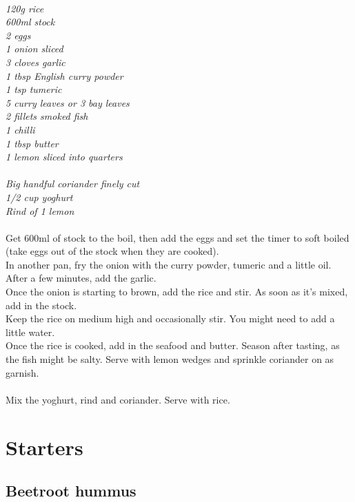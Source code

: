 \documentclass{tufte-book}
\begin{document}
\\\emph{120g rice
\\600ml stock
\\2 eggs
\\1 onion sliced
\\3 cloves garlic
\\1 tbsp English curry powder
\\1 tsp tumeric
\\5 curry leaves or 3 bay leaves
\\2 fillets smoked fish
\\1 chilli
\\1 tbsp butter
\\1 lemon sliced into quarters
}
\\
\\\emph{Big handful coriander finely cut
\\1/2 cup yoghurt
\\Rind of 1 lemon
}
\smallskip
\\
\\Get 600ml of stock to the boil, then add the eggs and set the timer to soft boiled (take eggs out of the stock when they are cooked).
\\In another pan, fry the onion with the curry powder, tumeric and a little oil. After a few minutes, add the garlic.
\\Once the onion is starting to brown, add the rice and stir. As soon as it's mixed, add in the stock. 
\\Keep the rice on medium high and occasionally stir. You might need to add a little water.
\\Once the rice is cooked, add in the seafood and butter. Season after tasting, as the fish might be salty. Serve with lemon wedges and sprinkle coriander on as garnish.
\\
\\Mix the yoghurt, rind and coriander. Serve with rice.

\chapter{Starters}
\section{Beetroot hummus}
\end{document}

